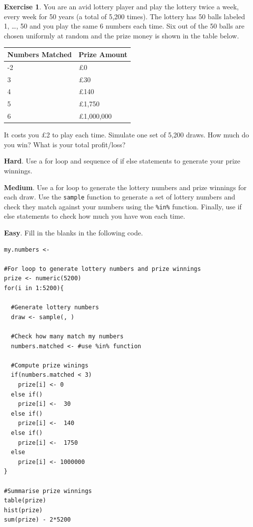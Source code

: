 \documentclass[
]{book}
\theoremstyle{definition}
\theoremstyle{definition}
\theoremstyle{definition}
\newtheorem{exercise}{Exercise}[chapter]
\theoremstyle{definition}
\theoremstyle{remark}
\begin{document}
\begin{exercise}

You are an avid lottery player and play the lottery twice a week, every week for 50 years (a total of 5,200 times). The lottery has 50 balls labeled 1, \ldots, 50 and you play the same 6 numbers each time. Six out of the 50 balls are chosen uniformly at random and the prize money is shown in the table below.

\begin{longtable}[]{@{}ll@{}}
\toprule\noalign{}
Numbers Matched & Prize Amount \\
\midrule\noalign{}
\endhead
\bottomrule\noalign{}
\endlastfoot
0-2 & £0 \\
3 & £30 \\
4 & £140 \\
5 & £1,750 \\
6 & £1,000,000 \\
\end{longtable}

It costs you £2 to play each time. Simulate one set of 5,200 draws. How much do you win? What is your total profit/loss?

\textbf{Hard}. Use a for loop and sequence of if else statements to generate your prize winnings.

\textbf{Medium}. Use a for loop to generate the lottery numbers and prize winnings for each draw. Use the \texttt{sample} function to generate a set of lottery numbers and check they match against your numbers using the \texttt{\%in\%} function. Finally, use if else statements to check how much you have won each time.

\textbf{Easy}. Fill in the blanks in the following code.

\begin{verbatim}
my.numbers <- 

#For loop to generate lottery numbers and prize winnings
prize <- numeric(5200)
for(i in 1:5200){
  
  #Generate lottery numbers
  draw <- sample(, )
  
  #Check how many match my numbers
  numbers.matched <- #use %in% function
  
  #Compute prize winings
  if(numbers.matched < 3)
    prize[i] <- 0
  else if()
    prize[i] <-  30
  else if()
    prize[i] <-  140
  else if()
    prize[i] <-  1750
  else
    prize[i] <- 1000000
}

#Summarise prize winnings
table(prize)
hist(prize)
sum(prize) - 2*5200
\end{verbatim}

\end{exercise}
\end{document}
